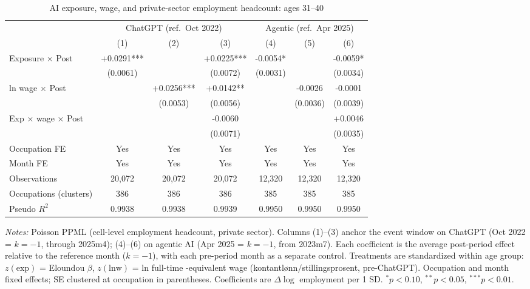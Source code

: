\begin{table}[htbp]\centering
\caption{AI exposure, wage, and private-sector employment headcount: ages 31–40}
\label{tab:ca_did_age2}
\small
\begin{tabular}{lcccccc}
\toprule
 & \multicolumn{3}{c}{ChatGPT (ref.\ Oct 2022)} & \multicolumn{3}{c}{Agentic (ref.\ Apr 2025)} \\
\cmidrule(lr){2-4} \cmidrule(lr){5-7}
 & (1) & (2) & (3) & (4) & (5) & (6) \\
\midrule
Exposure $\times$ Post & +0.0291*** &  & +0.0225*** & -0.0054* &  & -0.0059* \\
 & (0.0061) &  & (0.0072) & (0.0031) &  & (0.0034) \\
ln wage $\times$ Post &  & +0.0256*** & +0.0142** &  & -0.0026 & -0.0001 \\
 &  & (0.0053) & (0.0056) &  & (0.0036) & (0.0039) \\
Exp $\times$ wage $\times$ Post &  &  & -0.0060 &  &  & +0.0046 \\
 &  &  & (0.0071) &  &  & (0.0035) \\
\midrule
Occupation FE & Yes & Yes & Yes & Yes & Yes & Yes \\
Month FE & Yes & Yes & Yes & Yes & Yes & Yes \\
Observations & 20,072 & 20,072 & 20,072 & 12,320 & 12,320 & 12,320 \\
Occupations (clusters) & 386 & 386 & 386 & 385 & 385 & 385 \\
Pseudo $R^2$ & 0.9938 & 0.9938 & 0.9939 & 0.9950 & 0.9950 & 0.9950 \\
\bottomrule
\end{tabular}
\begin{minipage}{\linewidth}\vspace{2pt}\footnotesize
\emph{Notes:} Poisson PPML (cell-level employment headcount, private sector). Columns (1)--(3) anchor the event window on ChatGPT (Oct 2022 = $k{=}{-}1$, through 2025m4); (4)--(6) on agentic AI (Apr 2025 = $k{=}{-}1$, from 2023m7). Each coefficient is the average post-period effect relative to the reference month ($k{=}{-}1$), with each pre-period month as a separate control. Treatments are standardized within age group: $z(\text{exp})$ = Eloundou $\beta$, $z(\text{lnw})$ = ln full-time -equivalent wage (kontantl\o nn$/$stillingsprosent, pre-ChatGPT). Occupation and month fixed effects; SE clustered at occupation in parentheses. Coefficients are $\Delta\log$ employment per 1 SD. $^{*}p<0.10$, $^{**}p<0.05$, $^{***}p<0.01$.
\end{minipage}
\end{table}